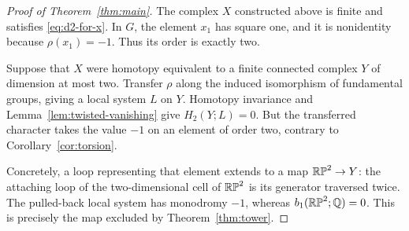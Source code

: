 \begin{proof}[Proof of Theorem~\ref{thm:main}]
The complex $X$ constructed above is finite and satisfies
\eqref{eq:d2-for-x}. In $G$, the element $x_1$ has square one,
and it is nonidentity because $\rho(x_1)=-1$. Thus its order is
exactly two.

Suppose that $X$ were homotopy equivalent to a finite connected
complex $Y$ of dimension at most two. Transfer $\rho$ along the
induced isomorphism of fundamental groups, giving a local system
$L$ on $Y$. Homotopy invariance and Lemma~\ref{lem:twisted-vanishing}
give $H_2(Y;L)=0$. But the transferred character takes the value
$-1$ on an element of order two, contrary to
Corollary~\ref{cor:torsion}.

Concretely, a loop representing that element extends to a map
$\mathbb{RP}^2\to Y$: the attaching loop of the two-dimensional cell of
$\mathbb{RP}^2$ is its generator traversed twice. The pulled-back local
system has monodromy $-1$, whereas $b_1(\mathbb{RP}^2;\mathbb Q)=0$.
This is precisely the map excluded by Theorem~\ref{thm:tower}.
\end{proof}
